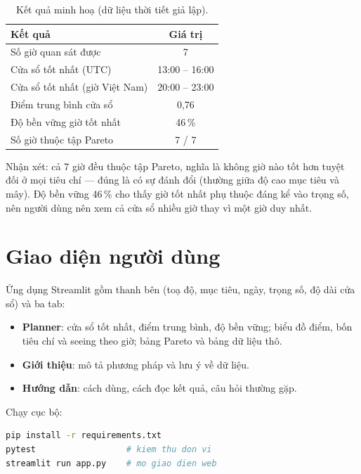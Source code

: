 \documentclass[12pt,a4paper]{article}
\begin{document}
\begin{table}[h]
\centering
\begin{tabular}{lc}
\toprule
\textbf{Kết quả} & \textbf{Giá trị} \\
\midrule
Số giờ quan sát được & 7 \\
Cửa sổ tốt nhất (UTC) & 13:00 -- 16:00 \\
Cửa sổ tốt nhất (giờ Việt Nam) & 20:00 -- 23:00 \\
Điểm trung bình cửa sổ & 0,76 \\
Độ bền vững giờ tốt nhất & 46\,\% \\
Số giờ thuộc tập Pareto & 7 / 7 \\
\bottomrule
\end{tabular}
\caption{Kết quả minh hoạ (dữ liệu thời tiết giả lập).}
\end{table}

Nhận xét: cả 7 giờ đều thuộc tập Pareto, nghĩa là không giờ nào tốt hơn tuyệt đối ở mọi tiêu
chí --- đúng là có sự đánh đổi (thường giữa độ cao mục tiêu và mây). Độ bền vững 46\,\% cho thấy
giờ tốt nhất phụ thuộc đáng kể vào trọng số, nên người dùng nên xem cả cửa sổ nhiều giờ thay vì
một giờ duy nhất.


\section{Giao diện người dùng}

Ứng dụng Streamlit gồm thanh bên (toạ độ, mục tiêu, ngày, trọng số, độ dài cửa sổ) và ba tab:
\begin{itemize}[nosep]
  \item \textbf{Planner}: cửa sổ tốt nhất, điểm trung bình, độ bền vững; biểu đồ điểm, bốn tiêu
        chí và seeing theo giờ; bảng Pareto và bảng dữ liệu thô.
  \item \textbf{Giới thiệu}: mô tả phương pháp và lưu ý về dữ liệu.
  \item \textbf{Hướng dẫn}: cách dùng, cách đọc kết quả, câu hỏi thường gặp.
\end{itemize}

Chạy cục bộ:
\begin{lstlisting}[language=bash]
pip install -r requirements.txt
pytest                  # kiem thu don vi
streamlit run app.py    # mo giao dien web
\end{lstlisting}
\end{document}
